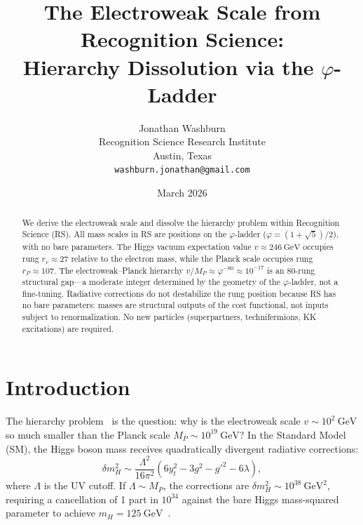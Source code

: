 \documentclass[12pt,a4paper]{article}
\title{The Electroweak Scale from Recognition Science:\\
Hierarchy Dissolution via the $\varphi$-Ladder}
\author{Jonathan Washburn\\
Recognition Science Research Institute\\
Austin, Texas\\
\texttt{washburn.jonathan@gmail.com}}
\date{March 2026}
\theoremstyle{definition}
\theoremstyle{remark}
\begin{document}
\maketitle

\begin{abstract}
We derive the electroweak scale and dissolve the hierarchy
problem within Recognition Science (RS).  All mass scales in
RS are positions on the $\varphi$-ladder
($\varphi = (1+\sqrt{5})/2$), with no bare parameters.  The
Higgs vacuum expectation value
$v \approx 246~\mathrm{GeV}$ occupies rung
$r_v \approx 27$ relative to the electron mass, while the
Planck scale occupies rung $r_P \approx 107$.  The
electroweak--Planck hierarchy
$v/M_P \approx \varphi^{-80} \approx 10^{-17}$ is an
80-rung structural gap---a moderate integer determined by
the geometry of the $\varphi$-ladder, not a fine-tuning.
Radiative corrections do not destabilize the rung position
because RS has no bare parameters: masses are structural
outputs of the cost functional, not inputs subject to
renormalization.  No new particles (superpartners,
technifermions, KK excitations) are required.
\end{abstract}

\section{Introduction}
\label{sec:intro}

The hierarchy problem~\cite{tHooft1980,Weinberg1976} is the
question: why is the electroweak scale
$v \sim 10^2~\mathrm{GeV}$ so much smaller than the Planck
scale $M_P \sim 10^{19}~\mathrm{GeV}$?  In the Standard
Model (SM), the Higgs boson mass receives quadratically
divergent radiative corrections:
\begin{equation}
  \delta m_H^2 \sim \frac{\Lambda^2}{16\pi^2}
  \left(6y_t^2 - 3g^2 - g'^2 - 6\lambda\right),
  \label{eq:radiative}
\end{equation}
where $\Lambda$ is the UV cutoff.  If $\Lambda \sim M_P$,
the corrections are $\delta m_H^2 \sim
10^{38}~\mathrm{GeV}^2$, requiring a cancellation of 1 part
in $10^{34}$ against the bare Higgs mass-squared parameter
to achieve $m_H = 125~\mathrm{GeV}$~\cite{ATLAS2012}.
\end{document}
